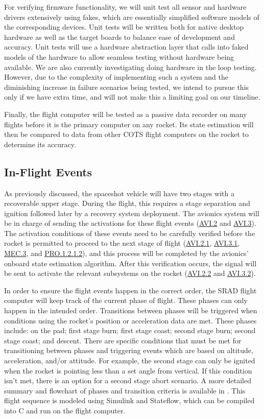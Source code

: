 For verifying firmware functionality, we will unit test all sensor and hardware drivers extensively using fakes, which are essentially simplified software models of the corresponding devices. Unit tests will be written both for native desktop hardware as well as the target boards to balance ease of development and accuracy. Unit tests will use a hardware abstraction layer that calls into faked models of the hardware to allow seamless testing without hardware being available. We are also currently investigating doing hardware in the loop testing. However, due to the complexity of implementing such a system and the diminishing increase in failure scenarios being tested, we intend to pursue this only if we have extra time, and will not make this a limiting goal on our timeline.

Finally, the flight computer will be tested as a passive data recorder on many flights before it is the primary computer on any rocket. Its state estimation will then be compared to data from other COTS flight computers on the rocket to determine its accuracy.


\subsection{In-Flight Events}
As previously discussed, the spaceshot vehicle will have two stages with a recoverable upper stage. During the flight, this requires a stage separation and ignition followed later by a recovery system deployment. The avionics system will be in charge of sending the activations for these flight events (\hyperlink{AVI.2}{AVI.2} and \hyperlink{AVI.3}{AVI.3}). The activation conditions of these events need to be carefully verified before the rocket is permitted to proceed to the next stage of flight (\hyperlink{AVI.2.1}{AVI.2.1}, \hyperlink{AVI.3.1}{AVI.3.1}, \hyperlink{MEC.3}{MEC.3}, and \hyperlink{PRO.1.2.1.2}{PRO.1.2.1.2}), and this process will be completed by the avionics' onboard state estimation algorithm. After this verification occurs, the signal will be sent to activate the relevant subsystems on the rocket (\hyperlink{AVI.2.2}{AVI.2.2} and \hyperlink{AVI.3.2}{AVI.3.2}).

In order to ensure the flight events happen in the correct order, the SRAD flight computer will keep track of the current phase of flight. These phases can only happen in the intended order. Transitions between phases will be triggered when conditions using the rocket's position or acceleration data are met. These phases include: on the pad; first stage burn; first stage coast; second stage burn; second stage coast; and descent. There are specific conditions that must be met for transitioning between phases and triggering events which are based on altitude, acceleration, and/or attitude. For example, the second stage can only be ignited when the rocket is pointing less than a set angle from vertical. If this condition isn't met, there is an option for a second stage abort scenario. A more detailed summary and flowchart of phases and transition criteria is available in . This flight sequence is modeled using Simulink and Stateflow, which can be compiled into C and run on the flight computer.


